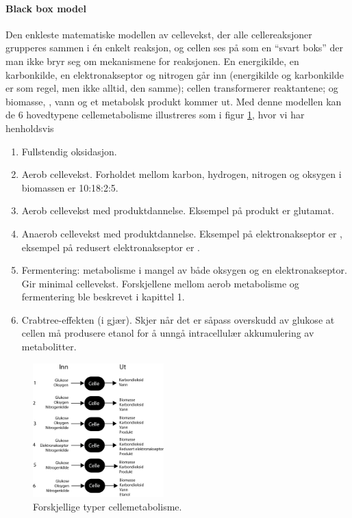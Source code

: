\paragraph{Black box model} Den enkleste matematiske modellen av cellevekst, der alle cellereaksjoner grupperes sammen i én enkelt reaksjon, og cellen ses på som en ``svart boks'' der man ikke bryr seg om mekanismene for reaksjonen. En energikilde, en karbonkilde, en elektronakseptor og nitrogen går inn (energikilde og karbonkilde er som regel, men ikke alltid, den samme); cellen transformerer reaktantene; og biomasse, , vann og et metabolsk produkt kommer ut. Med denne modellen kan de 6 hovedtypene cellemetabolisme illustreres som i figur \ref{fig:blackbox}, hvor vi har henholdsvis
\begin{enumerate}
	\item Fullstendig oksidasjon.
	\item Aerob cellevekst. Forholdet mellom karbon, hydrogen, nitrogen og oksygen i biomassen er 10:18:2:5.
	\item Aerob cellevekst med produktdannelse. Eksempel på produkt er glutamat.
	\item Anaerob cellevekst med produktdannelse. Eksempel på elektronakseptor er , eksempel på redusert elektronakseptor er .
	\item Fermentering: metabolisme i mangel av både oksygen og en elektronakseptor. Gir minimal cellevekst. Forskjellene mellom aerob metabolisme og fermentering ble beskrevet i kapittel 1.
	\item Crabtree-effekten (i gjær). Skjer når det er såpass overskudd av glukose at cellen må produsere etanol for å unngå intracellulær akkumulering av metabolitter.
\end{enumerate}
\begin{figure}[H]
	\centering
	\includegraphics[width=0.45\textwidth]{blackbox}
	\caption{Forskjellige typer cellemetabolisme.}
	\label{fig:blackbox}
\end{figure}
